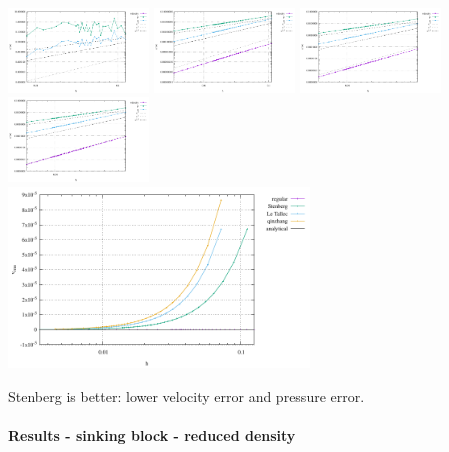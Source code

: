 \begin{center}
\includegraphics[width=3.74cm]{python_codes/fieldstone_78/results/aquarium/errors_regular.pdf}
\includegraphics[width=3.74cm]{python_codes/fieldstone_78/results/aquarium/errors_stenberg.pdf}
\includegraphics[width=3.74cm]{python_codes/fieldstone_78/results/aquarium/errors_letallec.pdf}
\includegraphics[width=3.74cm]{python_codes/fieldstone_78/results/aquarium/errors_qinzhang.pdf}\\
\includegraphics[width=8cm]{python_codes/fieldstone_78/results/aquarium/vrms.pdf}
\end{center}



Stenberg is better: lower velocity error and pressure error.


\newpage
\paragraph{Results - sinking block - reduced density}

